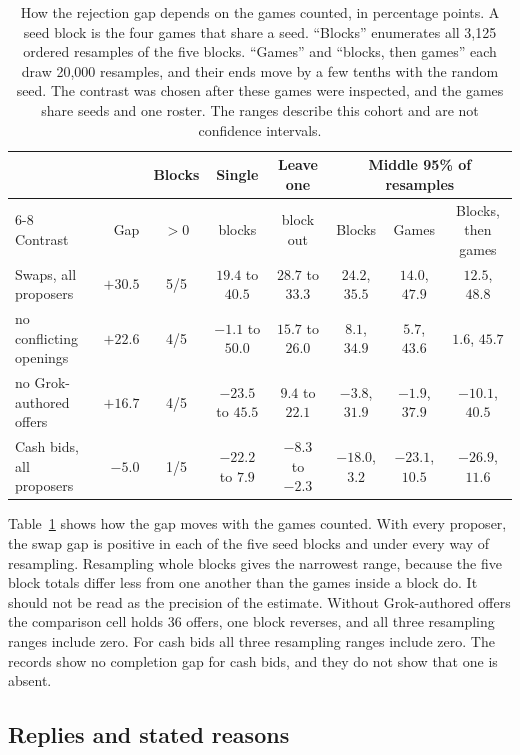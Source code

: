 \documentclass[11pt,letterpaper]{article}
\begin{document}
\begin{table}[htbp]\centering\footnotesize
\setlength{\tabcolsep}{2.4pt}
\begin{tabular}{@{}lrcccccc@{}}\toprule
 & & Blocks & Single & Leave one & \multicolumn{3}{c}{Middle 95\% of resamples}\\\cmidrule(l){6-8}
Contrast & Gap & $>0$ & blocks & block out & Blocks & Games & Blocks, then games\\\midrule
Swaps, all proposers & $+30.5$ & 5/5 & $19.4$ to $40.5$ & $28.7$ to $33.3$ & $24.2$, $35.5$ & $14.0$, $47.9$ & $12.5$, $48.8$\\
\quad no conflicting openings & $+22.6$ & 4/5 & $-1.1$ to $50.0$ & $15.7$ to $26.0$ & $8.1$, $34.9$ & $5.7$, $43.6$ & $1.6$, $45.7$\\
\quad no Grok-authored offers & $+16.7$ & 4/5 & $-23.5$ to $45.5$ & $9.4$ to $22.1$ & $-3.8$, $31.9$ & $-1.9$, $37.9$ & $-10.1$, $40.5$\\
Cash bids, all proposers & $-5.0$ & 1/5 & $-22.2$ to $7.9$ & $-8.3$ to $-2.3$ & $-18.0$, $3.2$ & $-23.1$, $10.5$ & $-26.9$, $11.6$\\\bottomrule
\end{tabular}
\caption{How the rejection gap depends on the games counted, in percentage points. A seed block is the four games that share a seed. ``Blocks'' enumerates all 3,125 ordered resamples of the five blocks. ``Games'' and ``blocks, then games'' each draw 20,000 resamples, and their ends move by a few tenths with the random seed. The contrast was chosen after these games were inspected, and the games share seeds and one roster. The ranges describe this cohort and are not confidence intervals.}
\label{tab:spread}
\end{table}

Table~\ref{tab:spread} shows how the gap moves with the games counted. With every proposer, the swap gap is positive in each of the five seed blocks and under every way of resampling. Resampling whole blocks gives the narrowest range, because the five block totals differ less from one another than the games inside a block do. It should not be read as the precision of the estimate. Without Grok-authored offers the comparison cell holds 36 offers, one block reverses, and all three resampling ranges include zero. For cash bids all three resampling ranges include zero. The records show no completion gap for cash bids, and they do not show that one is absent.

\subsection{Replies and stated reasons}
\end{document}
